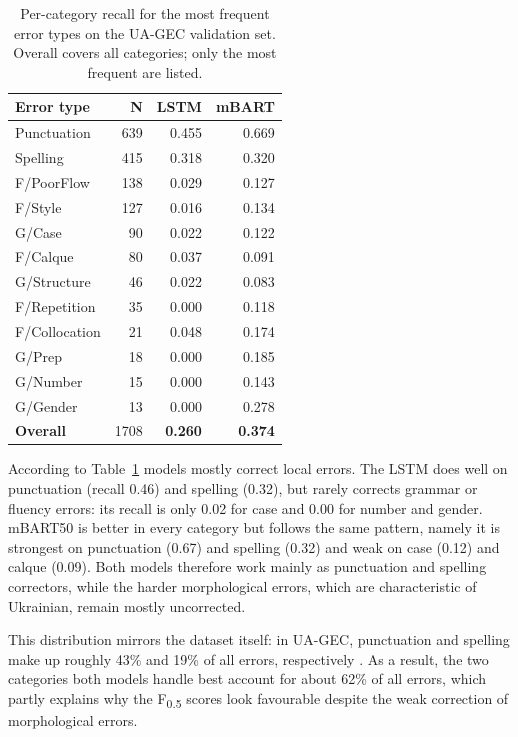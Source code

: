 \documentclass[11pt]{article}
\begin{document}
\begin{table}[h]
\centering
\renewcommand{\arraystretch}{1.2}
\setlength{\tabcolsep}{6pt}
\begin{tabular}{@{}lrrr@{}}
\hline
\textbf{Error type} & \textbf{N} & \textbf{LSTM} & \textbf{mBART} \\
\hline
Punctuation   &  639 & 0.455 & 0.669 \\
Spelling      &  415 & 0.318 & 0.320 \\
F/PoorFlow    &  138 & 0.029 & 0.127 \\
F/Style       &  127 & 0.016 & 0.134 \\
G/Case        &   90 & 0.022 & 0.122 \\
F/Calque      &   80 & 0.037 & 0.091 \\
G/Structure   &   46 & 0.022 & 0.083 \\
F/Repetition  &   35 & 0.000 & 0.118 \\
F/Collocation &   21 & 0.048 & 0.174 \\
G/Prep        &   18 & 0.000 & 0.185 \\
G/Number      &   15 & 0.000 & 0.143 \\
G/Gender      &   13 & 0.000 & 0.278 \\
\hline
\textbf{Overall} & 1708 & \textbf{0.260} & \textbf{0.374} \\
\hline
\end{tabular}
\caption{Per-category recall for the most frequent error types on the UA-GEC validation set. Overall covers all categories; only the most frequent are listed.}
\label{tab:error-analysis}
\end{table}

According to Table~\ref{tab:error-analysis} models mostly correct local errors. The LSTM does well on
punctuation (recall 0.46) and spelling (0.32), but rarely corrects grammar or fluency errors: its recall is only 0.02 for case and 0.00 for number and gender. mBART50 is better in every category but follows the same pattern, namely it is strongest on punctuation (0.67) and spelling (0.32) and weak on case (0.12) and calque (0.09). Both models therefore work mainly as punctuation and spelling correctors, while the harder morphological errors, which are characteristic of Ukrainian, remain mostly uncorrected.

This distribution mirrors the dataset itself: in UA-GEC, punctuation and spelling make up roughly 43\% and 19\% of all errors, respectively \citep{syvokon-etal-2023-ua}. As a result, the two categories both models handle best account for about 62\% of all errors, which partly explains why the F\textsubscript{0.5} scores look favourable despite the weak correction of morphological errors.
\end{document}
